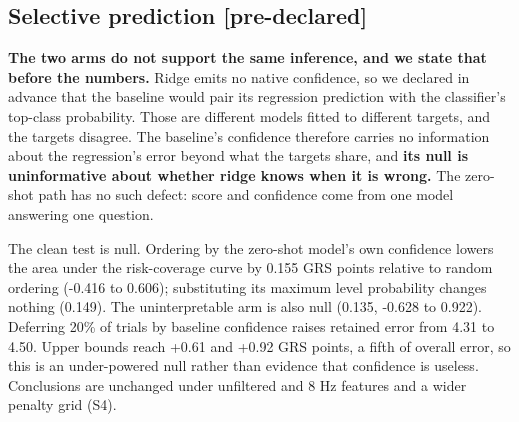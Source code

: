 \subsection{Selective prediction [pre-declared]}

\textbf{The two arms do not support the same inference, and we state that before the numbers.} Ridge emits no native confidence, so we declared in advance that the baseline would pair its regression prediction with the classifier's top-class probability. Those are different models fitted to different targets, and the targets disagree. The baseline's confidence therefore carries no information about the regression's error beyond what the targets share, and \textbf{its null is uninformative about whether ridge knows when it is wrong.} The zero-shot path has no such defect: score and confidence come from one model answering one question.

The clean test is null. Ordering by the zero-shot model's own confidence lowers the area under the risk-coverage curve by 0.155 GRS points relative to random ordering (-0.416 to 0.606); substituting its maximum level probability changes nothing (0.149). The uninterpretable arm is also null (0.135, -0.628 to 0.922). Deferring 20\% of trials by baseline confidence raises retained error from 4.31 to 4.50. Upper bounds reach +0.61 and +0.92 GRS points, a fifth of overall error, so this is an under-powered null rather than evidence that confidence is useless. Conclusions are unchanged under unfiltered and 8 Hz features and a wider penalty grid (S4).
